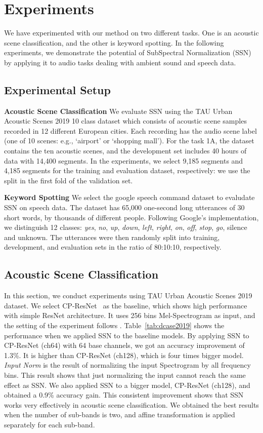 \documentclass{article}
\begin{document}
\section{Experiments}
\label{sec:exp}
We have experimented with our method on two different tasks. One is an acoustic scene classification, and the other is keyword spotting. In the following experiments, we demonstrate the potential of SubSpectral Normalization (SSN) by applying it to audio tasks dealing with ambient sound and speech data.

\subsection{Experimental Setup}
\textbf{Acoustic Scene Classification}
We evaluate SSN using the TAU Urban Acoustic Scenes 2019 10 class dataset \cite{Mesaros2018_DCASE} which consists of acoustic scene samples recorded in 12 different European cities. Each recording has the audio scene label (one of 10 scenes: e.g., `airport' or `shopping mall'). For the task 1A, the dataset contains the ten acoustic scenes, and the development set includes 40 hours of data with 14,400 segments. In the experiments, we select 9,185 segments and 4,185 segments for the training and evaluation dataset, respectively: we use the split in the first fold of the validation set.

\noindent\textbf{Keyword Spotting}
We select the google speech command dataset \cite{sainath2015convolutional} to evaludate SSN on speech data. The dataset has 65,000 one-second long utterances of 30 short words, by thousands of different people. Following Google’s implementation, we distinguish 12 classes: \textit{yes}, \textit{no}, \textit{up}, \textit{down}, \textit{left}, \textit{right}, \textit{on}, \textit{off}, \textit{stop}, \textit{go}, silence and unknown. The utterances were then randomly split into training, development, and evaluation sets in the ratio of 80:10:10, respectively.

\subsection{Acoustic Scene Classification}
In this section, we conduct experiments using TAU Urban Acoustic Scenes 2019 dataset. We select CP-ResNet~\cite{koutini2019receptive} as the baseline, which shows high performance with simple ResNet architecture. It uses 256 bins Mel-Spectrogram as input, and the setting of the experiment follows \cite{koutini2019receptive}.
Table~\ref{tab:dcase2019} shows the performance when we applied SSN to the baseline models. By applying SSN to CP-ResNet (ch64) with 64 base channels, we got an accuracy improvement of 1.3\%. It is higher than CP-ResNet (ch128), which is four times bigger model. \textit{Input Norm} is the result of normalizing the input Spectrogram by all frequency bins. This result shows that just normalizing the input cannot reach the same effect as SSN. We also applied SSN to a bigger model, CP-ResNet (ch128), and obtained a 0.9\% accuracy gain. This consistent improvement shows that SSN works very effectively in acoustic scene classification. We obtained the best results when the number of sub-bands  is two, and affine transformation is applied separately for each sub-band.
\end{document}
